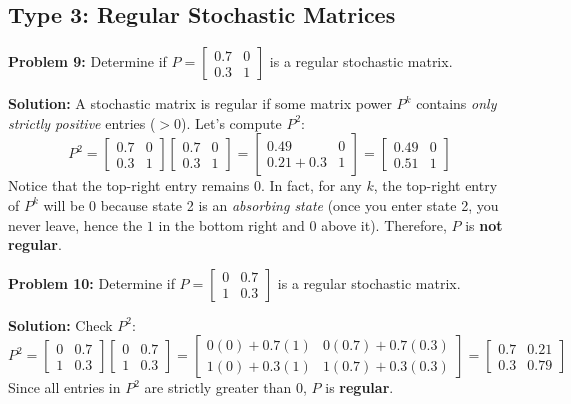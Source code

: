 \documentclass[11pt, letterpaper]{article}
\theoremstyle{definition}
\theoremstyle{remark}
\begin{document}
\subsection{Type 3: Regular Stochastic Matrices}

\textbf{Problem 9:} Determine if $P = \begin{bmatrix} 0.7 & 0 \\ 0.3 & 1 \end{bmatrix}$ is a regular stochastic matrix.

\textbf{Solution:}
A stochastic matrix is regular if some matrix power $P^k$ contains \textit{only strictly positive} entries ($>0$).
Let's compute $P^2$:
\[ P^2 = \begin{bmatrix} 0.7 & 0 \\ 0.3 & 1 \end{bmatrix} \begin{bmatrix} 0.7 & 0 \\ 0.3 & 1 \end{bmatrix} = \begin{bmatrix} 0.49 & 0 \\ 0.21 + 0.3 & 1 \end{bmatrix} = \begin{bmatrix} 0.49 & 0 \\ 0.51 & 1 \end{bmatrix} \]
Notice that the top-right entry remains $0$. In fact, for any $k$, the top-right entry of $P^k$ will be $0$ because state 2 is an \textit{absorbing state} (once you enter state 2, you never leave, hence the $1$ in the bottom right and $0$ above it). Therefore, $P$ is \textbf{not regular}.

\vspace{1em}
\textbf{Problem 10:} Determine if $P = \begin{bmatrix} 0 & 0.7 \\ 1 & 0.3 \end{bmatrix}$ is a regular stochastic matrix.

\textbf{Solution:}
Check $P^2$:
\[ P^2 = \begin{bmatrix} 0 & 0.7 \\ 1 & 0.3 \end{bmatrix} \begin{bmatrix} 0 & 0.7 \\ 1 & 0.3 \end{bmatrix} = \begin{bmatrix} 0(0) + 0.7(1) & 0(0.7) + 0.7(0.3) \\ 1(0) + 0.3(1) & 1(0.7) + 0.3(0.3) \end{bmatrix} = \begin{bmatrix} 0.7 & 0.21 \\ 0.3 & 0.79 \end{bmatrix} \]
Since all entries in $P^2$ are strictly greater than $0$, $P$ is \textbf{regular}.
\end{document}
